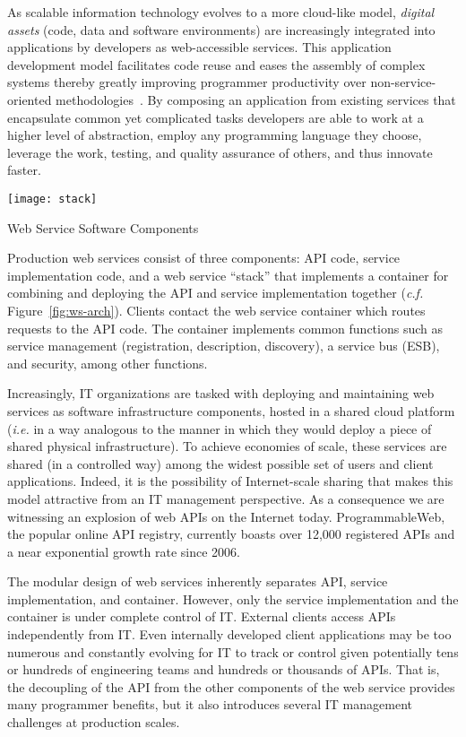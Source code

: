 As scalable information technology evolves to a more cloud-like model,
{\em digital assets} (code, data and software environments) 
are increasingly integrated into applications by developers 
as web-accessible services.
This application development model facilitates code reuse and eases the 
assembly of complex systems thereby greatly improving programmer productivity
over non-service-oriented methodologies~\cite{Dan:2008:SSR:1370916.1370923}. 
By composing an application from existing services that 
encapsulate common yet complicated tasks developers are able  
to work at a higher level of abstraction, employ any programming 
language they choose, leverage the work, testing, and quality
assurance of others, and thus innovate faster.  

\begin{floatingfigure}[rb]{2.8in}
\vspace{-0.1in}
\texttt{[image: stack]}
\vspace{-0.08in}
\caption{Web Service Software Components\label{fig:ws-arch}}
\end{floatingfigure}
Production web services consist of three components: API code, service
implementation code, and a web service ``stack'' that implements a container
for combining and deploying the API and service implementation
together ({\em c.f.} Figure~\ref{fig:ws-arch}).
Clients contact the web service container which routes requests to the
API code. The container implements common functions such as 
service management (registration, description, discovery), a service
bus (ESB), and security, among other 
functions.

Increasingly, IT organizations are tasked with deploying and 
maintaining web services as software infrastructure components, hosted in a
shared cloud platform ({\em i.e.} in a way analogous to the manner in which they
would deploy a piece of shared physical infrastructure).  
To achieve economies of scale, these services are shared (in a controlled
way) among the widest possible set of users and client applications.  Indeed,
it is the possibility of Internet-scale sharing that makes this model
attractive from an IT management perspective. As a consequence we 
are witnessing an explosion of web APIs on the Internet today. ProgrammableWeb,
the popular online API registry, currently boasts over 12,000 registered APIs and
a near exponential growth rate since 2006.

The modular design of web services inherently separates API, 
service implementation, and container. However, only 
the service implementation and the container is under complete
control of IT. External clients access APIs independently from IT.
Even internally developed client applications may be too numerous and
constantly evolving for IT to track or control given
potentially tens or hundreds of engineering teams and hundreds or 
thousands of APIs.  That is, the decoupling of the API from the 
other components of the web service provides many programmer
benefits, but it also introduces several IT management challenges 
at production scales. 

